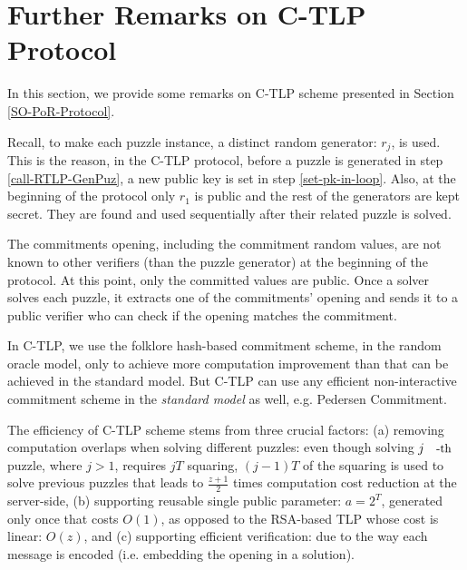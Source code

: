 

\section{Further Remarks on  C-TLP Protocol}\label{discussion-C-TLP}

In this section, we provide some remarks on  C-TLP scheme presented in Section \ref{SO-PoR-Protocol}. 

\begin{remark} Recall, to make each  puzzle instance, a distinct random generator: $r_{\scriptscriptstyle j}$, is used. This is the reason, in the C-TLP protocol, before a puzzle  is  generated   in step \ref{call-RTLP-GenPuz},  a new public key is set in step \ref{set-pk-in-loop}.  Also, at the beginning of the protocol only $r_{\scriptscriptstyle 1}$ is public and the rest of the generators are kept secret. They are found and used sequentially after their related puzzle is solved. 
\end{remark}


\begin{remark} The commitments opening, including the commitment random values, are not known to other verifiers (than the puzzle generator) at the beginning of the protocol. At this point,  only the committed values are public. Once a solver solves each puzzle,  it  extracts one of the commitments' opening and sends it to a public verifier who can check if the opening matches the commitment.  
\end{remark}

\begin{remark}
 In  C-TLP, we use the folklore hash-based commitment scheme, in the random oracle model, only to achieve more computation improvement than that can be achieved in the standard model. But C-TLP can use any efficient non-interactive commitment scheme in the \emph{standard model} as well, e.g. Pedersen Commitment.
\end{remark}


\begin{remark}
The efficiency of  C-TLP scheme stems from three crucial factors: (a) removing computation overlaps when solving different puzzles: even though solving $j\text{\small{-th}}$ puzzle, where $j>1$, requires $jT$ squaring, $(j-1) T$ of the squaring is used to solve previous puzzles that leads to $\frac{z+1}{2}$ times computation cost reduction at the server-side,  (b)  supporting reusable single  public parameter: $a=2^{\scriptscriptstyle T}$, generated only once that costs $O(1)$, as opposed to the RSA-based TLP whose cost is linear: $O(z)$, and (c) supporting efficient verification: due to the way each message is encoded (i.e. embedding the opening in a solution). 
\end{remark}



